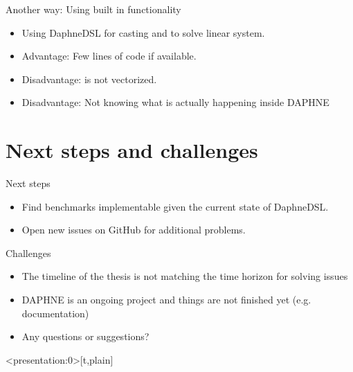 \documentclass[aspectratio=169]{beamer}
\begin{document}
\begin{frame}{Another way: Using built in functionality}
\begin{itemize}[<+>]
    \item Using DaphneDSL  for casting and  to solve linear system.
    \item Advantage: Few lines of code if available.
    \item Disadvantage:  is not vectorized.
    \item Disadvantage: Not knowing what is actually happening inside DAPHNE
\end{itemize}     
\end{frame}


\section{Next steps and challenges}

\begin{frame}{Next steps}
\begin{itemize}
    \item Find benchmarks implementable given the current state of DaphneDSL.
    \item Open new issues on GitHub for additional problems.
\end{itemize}     
\end{frame}

\begin{frame}{Challenges}
\begin{itemize}[<+>]
    \item The timeline of the thesis is not matching the time horizon for solving issues
    \item DAPHNE is an ongoing project and things are not finished yet (e.g. documentation)
    \item Any questions or suggestions?
\end{itemize}     
\end{frame}


\begin{frame}<presentation:0>[t,plain]
\end{frame}
\end{document}
